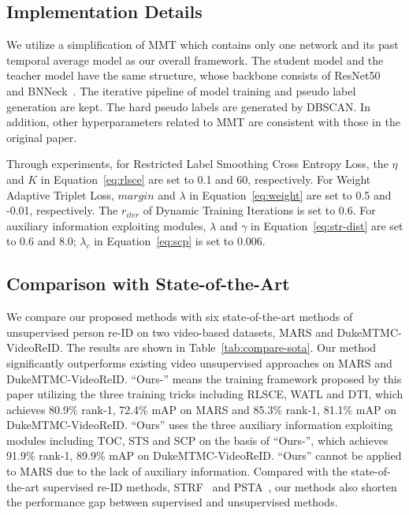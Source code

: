 \documentclass[10pt,twocolumn,letterpaper]{article}
\begin{document}
\subsection{Implementation Details}

We utilize a simplification of MMT which contains only one network and its past temporal average model as our overall framework. The student model and the teacher model have the same structure, whose backbone consists of ResNet50~\cite{resnet} and BNNeck~\cite{bot}. The iterative pipeline of model training and pseudo label generation are kept. The hard pseudo labels are generated by DBSCAN. In addition, other hyperparameters related to MMT are consistent with those in the original paper.

Through experiments, for Restricted Label Smoothing Cross Entropy Loss, the $\eta$ and $K$ in Equation~\ref{eq:rlsce} are set to 0.1 and 60, respectively. For Weight Adaptive Triplet Loss, $margin$ and $\lambda$ in Equation~\ref{eq:weight} are set to 0.5 and -0.01, respectively. The $r_{iter}$ of Dynamic Training Iterations is set to 0.6. For auxiliary information exploiting modules, $\lambda$ and $\gamma$ in Equation~\ref{eq:str-dist} are set to 0.6 and 8.0; $\lambda_c$ in Equation~\ref{eq:scp} is set to 0.006.

\subsection{Comparison with State-of-the-Art}

We compare our proposed methods with six state-of-the-art methods of unsupervised person re-ID on two video-based datasets, MARS and DukeMTMC-VideoReID. The results are shown in Table~\ref{tab:compare-sota}. Our method significantly outperforms existing video unsupervised approaches on MARS and DukeMTMC-VideoReID. ``Ours-'' means the training framework proposed by this paper utilizing the three training tricks including RLSCE, WATL and DTI, which achieves 80.9\% rank-1, 72.4\% mAP on MARS and 85.3\% rank-1, 81.1\% mAP on DukeMTMC-VideoReID. ``Ours'' uses the three auxiliary information exploiting modules including TOC, STS and SCP on the basis of ``Ours-'', which achieves 91.9\% rank-1, 89.9\% mAP on DukeMTMC-VideoReID. ``Ours'' cannot be applied to MARS due to the lack of auxiliary information. Compared with the state-of-the-art supervised re-ID methods, STRF~\cite{strf} and PSTA~\cite{psta}, our methods also shorten the performance gap between supervised and unsupervised methods.
\end{document}
